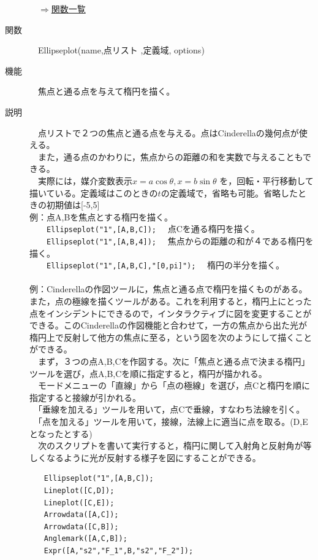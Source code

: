 \documentclass[papersize,a4paper,12pt,uplatex]{jsarticle}
\begin{document}
\begin{description}
\begin{flushright}　\hyperlink{functionlist}{$\Rightarrow$関数一覧}\end{flushright}

\hypertarget{ellipseplot}{}
\item[関数]　Ellipseplot(name,点リスト ,定義域, options)
\item[機能]　焦点と通る点を与えて楕円を描く。
\item[説明]　点リストで２つの焦点と通る点を与える。点はCinderellaの幾何点が使える。\\
　また，通る点のかわりに，焦点からの距離の和を実数で与えることもできる。\\
　実際には，媒介変数表示$x=a \cos \theta,x=b \sin \theta$ を，回転・平行移動して描いている。定義域はこのときの$t$の定義域で，省略も可能。省略したときの初期値は[-5,5]\\

例：点A,Bを焦点とする楕円を描く。\\
　　\verb|Ellipseplot("1",[A,B,C]);|　 点Cを通る楕円を描く。\\
　　\verb|Ellipseplot("1",[A,B,4]);| 　焦点からの距離の和が４である楕円を描く。\\
　　\verb|Ellipseplot("1",[A,B,C],"[0,pi]");| 　楕円の半分を描く。\\
　\\
例：Cinderellaの作図ツールに，焦点と通る点で楕円を描くものがある。また，点の極線を描くツールがある。これを利用すると，楕円上にとった点をインシデントにできるので，インタラクティブに図を変更することができる。このCinderellaの作図機能と合わせて，一方の焦点から出た光が楕円上で反射して他方の焦点に至る，という図を次のようにして描くことができる。\\
　まず，３つの点A,B,Cを作図する。次に「焦点と通る点で決まる楕円」ツールを選び，点A,B,Cを順に指定すると，楕円が描かれる。\\

　モードメニューの「直線」から「点の極線」を選び，点Cと楕円を順に指定すると接線が引かれる。\\
　「垂線を加える」ツールを用いて，点Cで垂線，すなわち法線を引く。\\
　「点を加える」ツールを用いて，接線，法線上に適当に点を取る。(D,Eとなったとする)\\
　次のスクリプトを書いて実行すると，楕円に関して入射角と反射角が等しくなるように光が反射する様子を図にすることができる。
\begin{verbatim}
　　Ellipseplot("1",[A,B,C]);
　　Lineplot([C,D]);
　　Lineplot([C,E]);
　　Arrowdata([A,C]);
　　Arrowdata([C,B]);
　　Anglemark([A,C,B]);
　　Expr([A,"s2","F_1",B,"s2","F_2"]);
\end{verbatim}
　\\
　　\\


\end{description}
\end{document}
